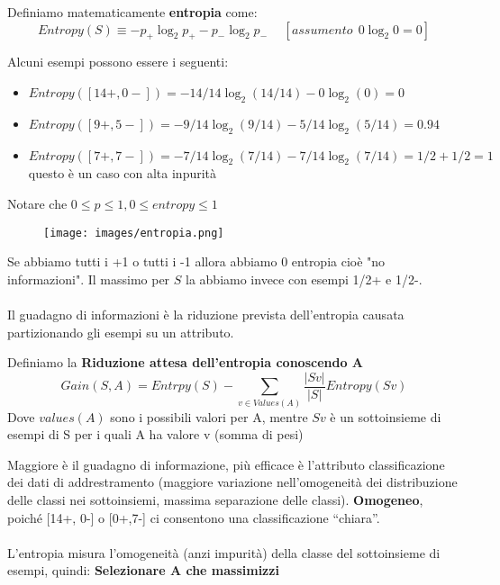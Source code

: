 \begin{definition}
    Definiamo matematicamente \textbf{entropia} come:
    $$Entropy(S) \equiv -p_+ \log_2 p_+ - p_- \log_2p_- \hspace{15pt} [assumento \:\: 0\log_2 0 = 0]$$
\end{definition}
\begin{example}
    Alcuni esempi possono essere i seguenti:
    \begin{itemize}
        \item $Entropy([14+, 0-]) = -14/14\log_2(14/14) - 0\log_2(0) = 0$
        \item $Entropy([9+, 5-]) = -9/14\log_2(9/14) - 5/14\log_2(5/14) = 0.94$
        \item $Entropy([7+, 7-]) = -7/14\log_2(7/14) - 7/14\log_2(7/14) = 1/2 + 1/2 = 1$ questo è un caso con alta inpurità
    \end{itemize}
\end{example}
\begin{note}
    Notare che $0 \leq p \leq 1, 0 \leq entropy \leq 1$
\end{note}
\begin{figure}[h!]
    \centering
    \texttt{[image: images/entropia.png]}
\end{figure}
Se abbiamo tutti i +1 o tutti i -1 allora abbiamo 0 entropia cioè "no informazioni". Il massimo per $S$ la abbiamo invece con esempi 1/2+ e 1/2-.\\\\
Il guadagno di informazioni è la riduzione prevista dell'entropia causata partizionando gli esempi su un attributo. 
\begin{definition}
    Definiamo la \textbf{Riduzione attesa dell’entropia conoscendo A}
    $$Gain(S, A) = Entrpy(S) - \sum_{v \in Values(A)}\frac{|Sv|}{|S|}Entropy(Sv)$$
    Dove $values(A)$ sono i possibili valori per A, mentre $Sv$ è un sottoinsieme di esempi di S per i quali A ha valore v (somma di pesi)
\end{definition}
\hspace{-15pt}Maggiore è il guadagno di informazione, più efficace è l'attributo classificazione dei dati di addrestramento (maggiore variazione nell'omogeneità dei distribuzione delle classi nei sottoinsiemi, massima separazione delle classi).
\textbf{Omogeneo}, poiché [14+, 0-] o [0+,7-] ci consentono una classificazione “chiara”.\\\\
L'entropia misura l'omogeneità (anzi impurità) della classe del sottoinsieme di esempi, quindi: \textbf{Selezionare A che massimizzi}
